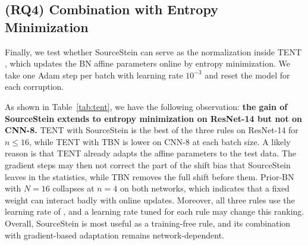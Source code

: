 \subsection{(RQ4) Combination with Entropy Minimization} \label{sec:extension}
Finally, we test whether SourceStein can serve as the normalization inside TENT \cite{TENT}, which updates the BN affine parameters online by entropy minimization.
We take one Adam step per batch with learning rate $10^{-3}$ and reset the model for each corruption.

\begin{table}[t]
\centering
\renewcommand{\arraystretch}{0.9}
\caption{Error (\%) of TENT with three normalization rules on CIFAR-10-C at severity 5. The best result in each column is \textbf{bold}.}
\label{tab:tent}
\vspace{-10pt}
\end{table}

As shown in Table~\ref{tab:tent}, we have the following observation: \textbf{the gain of SourceStein extends to entropy minimization on ResNet-14 but not on CNN-8.}
TENT with SourceStein is the best of the three rules on ResNet-14 for $n \le 16$, while TENT with TBN is lower on CNN-8 at each batch size.
A likely reason is that TENT already adapts the affine parameters to the test data.
The gradient steps may then not correct the part of the shift bias that SourceStein leaves in the statistics, while TBN removes the full shift before them.
Prior-BN with $N{=}16$ collapses at $n{=}4$ on both networks, which indicates that a fixed weight can interact badly with online updates.
Moreover, all three rules use the learning rate of \citet{TENT}, and a learning rate tuned for each rule may change this ranking.
Overall, SourceStein is most useful as a training-free rule, and its combination with gradient-based adaptation remains network-dependent.
